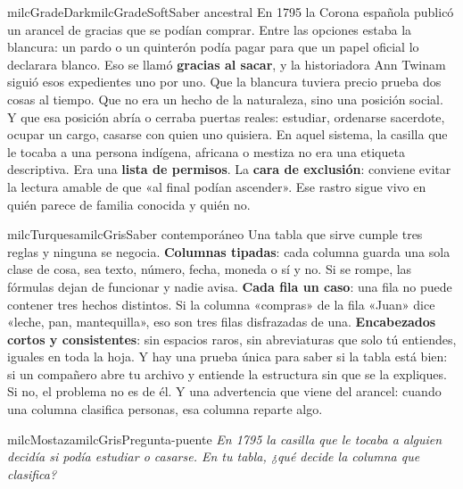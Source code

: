 \documentclass[11pt,letterpaper]{article}
\begin{document}
\begin{softbox}{milcGradeDark}{milcGradeSoft}{Saber ancestral}
En 1795 la Corona española publicó un arancel de gracias que se podían comprar. Entre las opciones estaba la blancura: un pardo o un quinterón podía pagar para que un papel oficial lo declarara blanco. Eso se llamó \textbf{gracias al sacar}, y la historiadora Ann Twinam siguió esos expedientes uno por uno. Que la blancura tuviera precio prueba dos cosas al tiempo. Que no era un hecho de la naturaleza, sino una posición social. Y que esa posición abría o cerraba puertas reales: estudiar, ordenarse sacerdote, ocupar un cargo, casarse con quien uno quisiera. En aquel sistema, la casilla que le tocaba a una persona indígena, africana o mestiza no era una etiqueta descriptiva. Era una \textbf{lista de permisos}. La \textbf{cara de exclusión}: conviene evitar la lectura amable de que «al final podían ascender». Ese rastro sigue vivo en quién parece de familia conocida y quién no.\par{}
\end{softbox}

\begin{softbox}{milcTurquesa}{milcGris}{Saber contemporáneo}
Una tabla que sirve cumple tres reglas y ninguna se negocia. \textbf{Columnas tipadas}: cada columna guarda una sola clase de cosa, sea texto, número, fecha, moneda o sí y no. Si se rompe, las fórmulas dejan de funcionar y nadie avisa. \textbf{Cada fila un caso}: una fila no puede contener tres hechos distintos. Si la columna «compras» de la fila «Juan» dice «leche, pan, mantequilla», eso son tres filas disfrazadas de una. \textbf{Encabezados cortos y consistentes}: sin espacios raros, sin abreviaturas que solo tú entiendes, iguales en toda la hoja. Y hay una prueba única para saber si la tabla está bien: si un compañero abre tu archivo y entiende la estructura sin que se la expliques. Si no, el problema no es de él. Y una advertencia que viene del arancel: cuando una columna clasifica personas, esa columna reparte algo.
\end{softbox}

\begin{softbox}{milcMostaza}{milcGris}{Pregunta-puente}
\textit{En 1795 la casilla que le tocaba a alguien decidía si podía estudiar o casarse. En tu tabla, ¿qué decide la columna que clasifica?}
\end{softbox}
\end{document}
